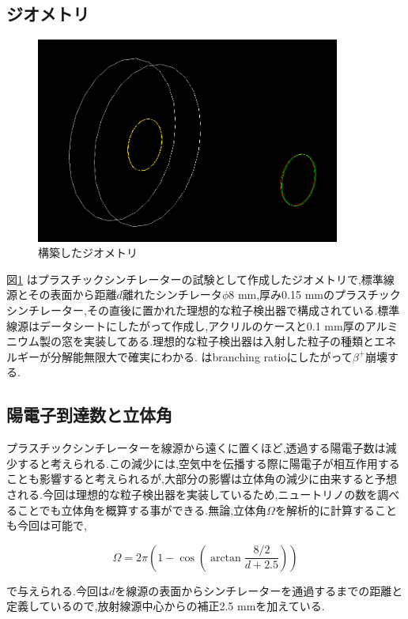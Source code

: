 \subsection{ジオメトリ}

\begin{figure}[htbp]
	\centering
		\includegraphics[width=10cm]{img/test1_geo.png}
	\caption{構築したジオメトリ}
	\label{test1_geo}
\end{figure}

図\ref{test1_geo} はプラスチックシンチレーターの試験として作成したジオメトリで,標準線源とその表面から距離$d$離れたシンチレータ$\phi8$ mm,厚み0.15 mmのプラスチックシンチレーター,その直後に置かれた理想的な粒子検出器で構成されている.標準線源はデータシートにしたがって作成し,アクリルのケースと0.1 mm厚のアルミニウム製の窓を実装してある.理想的な粒子検出器は入射した粒子の種類とエネルギーが分解能無限大で確実にわかる.
はbranching ratioにしたがって$\beta^+$崩壊する.

\subsection{陽電子到達数と立体角}

プラスチックシンチレーターを線源から遠くに置くほど,透過する陽電子数は減少すると考えられる.この減少には,空気中を伝播する際に陽電子が相互作用することも影響すると考えられるが,大部分の影響は立体角の減少に由来すると予想される.今回は理想的な粒子検出器を実装しているため,ニュートリノの数を調べることでも立体角を概算する事ができる.無論,立体角$\Omega$を解析的に計算することも今回は可能で,

\begin{equation}
	\Omega = 2\pi \left( 1-\cos\left(\arctan\frac{8/2}{d+2.5}\right)\right)
\end{equation}

で与えられる.今回は$d$を線源の表面からシンチレーターを通過するまでの距離と定義しているので,放射線源中心からの補正2.5 mmを加えている.

